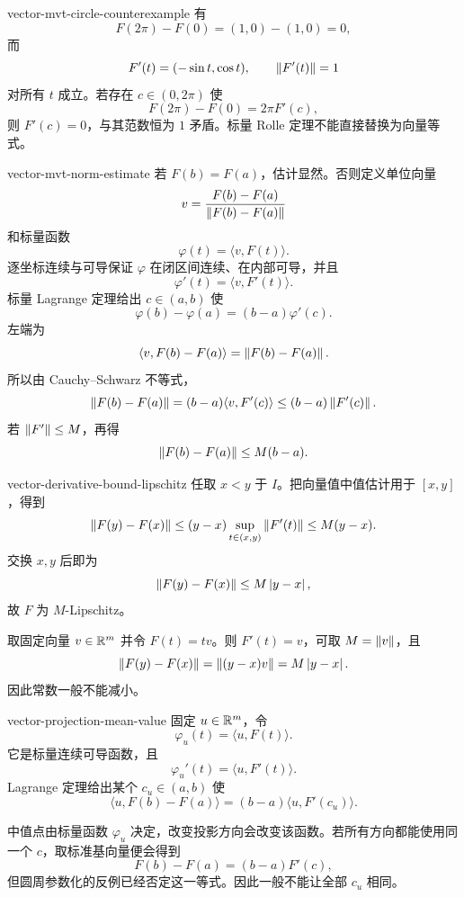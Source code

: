 \begin{solution}{vector-mvt-circle-counterexample}
有
\[
 F(2\pi)-F(0)=(1,0)-(1,0)=0,
\]
而
\[
 F'(t)=(-\sin t,\cos t),
\qquad
 \left\lVert F'(t)\right\rVert=1
\]
对所有 \(t\) 成立。若存在 \(c\in(0,2\pi)\) 使
\[
 F(2\pi)-F(0)=2\pi F'(c),
\]
则 \(F'(c)=0\)，与其范数恒为 \(1\) 矛盾。标量 Rolle 定理不能直接替换为向量等式。
\end{solution}

\begin{solution}{vector-mvt-norm-estimate}
若 \(F(b)=F(a)\)，估计显然。否则定义单位向量
\[
 v=\frac{F(b)-F(a)}{\left\lVert F(b)-F(a)\right\rVert}
\]
和标量函数
\[
 \varphi(t)=\langle v,F(t)\rangle.
\]
逐坐标连续与可导保证 \(\varphi\) 在闭区间连续、在内部可导，并且
\[
 \varphi'(t)=\langle v,F'(t)\rangle.
\]
标量 Lagrange 定理给出 \(c\in(a,b)\) 使
\[
 \varphi(b)-\varphi(a)
 =(b-a)\varphi'(c).
\]
左端为
\[
 \langle v,F(b)-F(a)\rangle
 =\left\lVert F(b)-F(a)\right\rVert.
\]
所以由 Cauchy--Schwarz 不等式，
\[
 \left\lVert F(b)-F(a)\right\rVert
 =(b-a)\langle v,F'(c)\rangle
 \le(b-a)\left\lVert F'(c)\right\rVert.
\]
若 \(\left\lVert F'\right\rVert\le M\)，再得
\[
 \left\lVert F(b)-F(a)\right\rVert\le M(b-a).
\]
\end{solution}

\begin{solution}{vector-derivative-bound-lipschitz}
任取 \(x<y\) 于 \(I\)。把向量值中值估计用于 \([x,y]\)，得到
\[
 \left\lVert F(y)-F(x)\right\rVert
 \le (y-x)\sup_{t\in(x,y)}\left\lVert F'(t)\right\rVert
 \le M(y-x).
\]
交换 \(x,y\) 后即为
\[
 \left\lVert F(y)-F(x)\right\rVert\le M\left|y-x\right|,
\]
故 \(F\) 为 \(M\)-Lipschitz。

取固定向量 \(v\in\mathbb{R}^m\) 并令 \(F(t)=tv\)。则 \(F'(t)=v\)，可取 \(M=\left\lVert v\right\rVert\)，且
\[
 \left\lVert F(y)-F(x)\right\rVert
 =\left\lVert(y-x)v\right\rVert
 =M\left|y-x\right|.
\]
因此常数一般不能减小。
\end{solution}

\begin{solution}{vector-projection-mean-value}
固定 \(u\in\mathbb{R}^m\)，令
\[
 \varphi_u(t)=\langle u,F(t)\rangle.
\]
它是标量连续可导函数，且
\[
 \varphi_u'(t)=\langle u,F'(t)\rangle.
\]
Lagrange 定理给出某个 \(c_u\in(a,b)\) 使
\[
 \langle u,F(b)-F(a)\rangle
 =(b-a)\langle u,F'(c_u)\rangle.
\]

中值点由标量函数 \(\varphi_u\) 决定，改变投影方向会改变该函数。若所有方向都能使用同一个 \(c\)，取标准基向量便会得到
\[
 F(b)-F(a)=(b-a)F'(c),
\]
但圆周参数化的反例已经否定这一等式。因此一般不能让全部 \(c_u\) 相同。
\end{solution}

